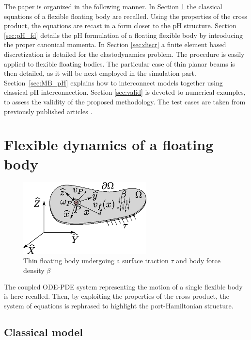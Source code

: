 \documentclass{svjour3}                     %
\begin{document}
	\indent The paper is organized in the following manner. In Section \ref{sec:class_model} the classical equations of a flexible floating body are recalled. Using the properties of the cross product, the equations are recast in a form closer to the pH structure. Section \ref{sec:pH_fd} details the pH formulation of a floating flexible body by introducing the proper canonical momenta. In Section \ref{sec:discr} a finite element based discretization is detailed for the elastodynamics problem. The procedure is easily applied to flexible floating bodies. The particular case of thin planar beams is then detailed, as it will be next employed in the simulation part. Section~\ref{sec:MB_pH} explains how to interconnect models together using classical pH interconnection. Section \ref{sec:valid} is devoted to numerical examples, to assess the validity of the proposed methodology. The test cases are taken from previously published articles \cite{Chebbi2017,Ellenbroek2018}.
	
	
	
	\section{Flexible dynamics of a floating body}
	\label{sec:class_model}
	
	\begin{figure}[t]
		\centering
		\includegraphics[width=0.6\textwidth]{floating_body.eps} 
		\caption{Thin floating body undergoing a surface traction $\tau$ and body force density $\beta$}
		\label{fig:float_body}
	\end{figure}
	The coupled ODE-PDE system representing the motion of a single flexible body is here recalled. Then, by exploiting the properties of the cross product, the system of equations is rephrased to highlight the port-Hamiltonian structure.
	
	\subsection{Classical model}
	
\end{document}
